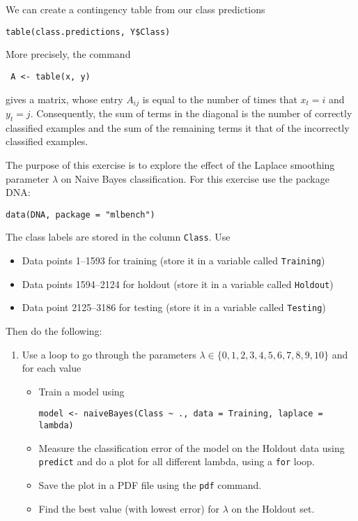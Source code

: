 \documentclass{article}
\begin{document}
We can create a contingency table from our class predictions
\begin{lstlisting}
table(class.predictions, Y$Class) 
\end{lstlisting}
More precisely, the command
\begin{lstlisting}
 A <- table(x, y)
\end{lstlisting}
gives a matrix, whose entry $A_{ij}$ is equal to the number of times
that $x_t = i$ and $y_t = j$. Consequently, the sum of terms in the diagonal is the number of correctly classified examples and the sum of the remaining terms it that of the incorrectly classified examples.


\begin{exercise}
  The purpose of this exercise is to explore the effect of the Laplace smoothing parameter $\lambda$ on Naive Bayes classification. For this exercise use the package DNA:
\begin{lstlisting}
data(DNA, package = "mlbench")
\end{lstlisting}
  The class labels are stored in the column \texttt{Class}. Use
  \begin{itemize}
  \item Data points 1--1593 for training (store it in a variable called \texttt{Training})
  \item Data points 1594--2124 for holdout (store it in a variable called \texttt{Holdout})
  \item Data point 2125--3186 for testing  (store it in a variable called \texttt{Testing})
  \end{itemize}
  Then do the following:
  \begin{enumerate}
  \item Use a loop to go through the parameters $\lambda  \in \{0, 1, 2, 3, 4, 5, 6, 7, 8, 9, 10\}$ and for each value
    \begin{itemize}
    \item Train a model using 
\begin{lstlisting}
model <- naiveBayes(Class ~ ., data = Training, laplace = lambda)
\end{lstlisting}
    \item Measure the classification error of the model on the Holdout data using \texttt{predict} and do a plot for all different lambda, using a \texttt{for} loop.
    \item Save the plot in a PDF file using the \texttt{pdf} command.
    \item Find the best value (with lowest error) for $\lambda$ on the Holdout set.

\end{itemize}
\end{enumerate}
\end{exercise}
\end{document}
